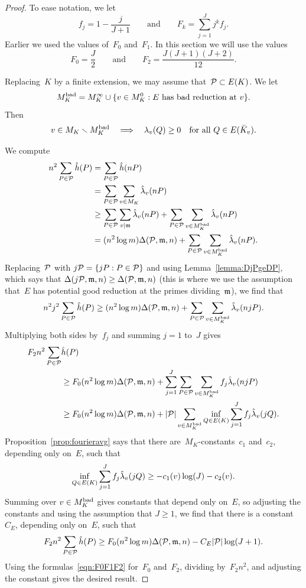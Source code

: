 \documentclass[12pt,reqno]{amsart}
\begin{document}
\begin{proof}
To ease notation, we let
\[
  f_j = 1-\frac{j}{J+1}
  \qquad\text{and}\qquad
  F_k = \sum_{j=1}^J j^kf_j.
\]
Earlier we used the values of~$F_0$ and~$F_1$. In this section we will
use the values
\begin{equation}
  \label{eqn:F0F1F2}
  F_0 = \frac{J}{2}
  \qquad\text{and}\qquad
  F_2 = \frac{J(J+1)(J+2)}{12}.
\end{equation}
\par
Replacing~$K$ by a finite extension, we may assume that~${\mathcal P}\subset
E(K)$.  We let
\[
  M_K^{\textup{bad}} = M_K^\infty \cup \{v\in M_K^0 : 
   \text{$E$ has bad reduction at $v$}\} .
\]
Then
\[
  v\in M_K\smallsetminus M_K^{\textup{bad}}
  \quad\Longrightarrow\quad
  \lambda_v(Q)\ge0\quad\text{for all $Q\in E({\bar K}_v)$.}
\]
\par
We compute
\begin{align*}
  n^2\sum_{P\in{\mathcal P}} {\hat h}(P)
  & = \sum_{P\in{\mathcal P}} {\hat h}(nP) \\
  & = \sum_{P\in{\mathcal P}} \sum_{v\in M_K} \hat\lambda_v(nP) \\
  &\ge \sum_{P\in{\mathcal P}} \sum_{v\mid{\mathfrak{m}}} \hat\lambda_v(nP) 
       + \sum_{P\in{\mathcal P}} \sum_{v\in M_K^{\textup{bad}}} \hat\lambda_v(nP) \\
  &= (n^2\log m)\Delta({\mathcal P},{\mathfrak{m}},n)
       + \sum_{P\in{\mathcal P}} \sum_{v\in M_K^{\textup{bad}}} \hat\lambda_v(nP).
\end{align*}
Replacing~${\mathcal P}$ with $j{\mathcal P}=\{jP:P\in{\mathcal P}\}$ and using
Lemma~\ref{lemma:DjPgeDP}, which says that
$\Delta(j{\mathcal P},{\mathfrak{m}},n)\ge\Delta({\mathcal P},{\mathfrak{m}},n)$ (this is where we use the
assumption that~$E$ has potential good reduction at the primes
dividing~${\mathfrak{m}}$), we find that
\[
  n^2j^2\sum_{P\in{\mathcal P}} {\hat h}(P)
  \ge (n^2\log m)\Delta({\mathcal P},{\mathfrak{m}},n)
       + \sum_{P\in{\mathcal P}} \sum_{v\in M_K^{\textup{bad}}} \hat\lambda_v(njP).
\]
Multiplying both sides by~$f_j$ and summing $j=1$ to~$J$ gives
\begin{align*}
  F_2n^2\sum_{P\in{\mathcal P}}& {\hat h}(P)\\
  &\ge F_0(n^2\log m)\Delta({\mathcal P},{\mathfrak{m}},n)
       + \sum_{j=1}^J \sum_{P\in{\mathcal P}} \sum_{v\in M_K^{\textup{bad}}} f_j\hat\lambda_v(njP) \\
  &\ge F_0(n^2\log m)\Delta({\mathcal P},{\mathfrak{m}},n)
       + |{\mathcal P}|\sum_{v\in M_K^{\textup{bad}}} \inf_{Q\in E(K)} \sum_{j=1}^J f_j\hat\lambda_v(jQ).
\end{align*}
Proposition~\ref{prop:fourieravg} says that there
are~$M_K$-constants~$c_1$ and~$c_2$, depending only on~$E$, such that
\[
  \inf_{Q\in E(K)} \sum_{j=1}^J f_j\hat\lambda_v(jQ) \ge -c_1(v)\log(J)-c_2(v).
\]
Summing over $v\in M_K^{\textup{bad}}$ gives constants that depend only on~$E$,
so adjusting the constants and using the assumption that $J\ge1$, we
find that there is a constant~$C_E$, depending only on~$E$, such that
\[
  F_2n^2\sum_{P\in{\mathcal P}} {\hat h}(P)
  \ge F_0(n^2\log m)\Delta({\mathcal P},{\mathfrak{m}},n)
       -C_E |{\mathcal P}|\log(J+1).
\]
Using the formulas~\eqref{eqn:F0F1F2} for~$F_0$ and~$F_2$, dividing
by~$F_2n^2$, and adjusting the constant gives the desired result.
\end{proof}
\end{document}
